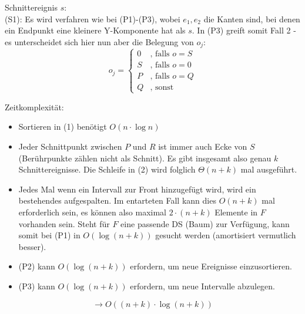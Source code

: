 Schnittereignis $s$:\\
(S1): Es wird verfahren wie bei (P1)-(P3), wobei $e_1,e_2$ die Kanten sind, bei denen ein Endpunkt eine kleinere Y-Komponente hat als $s$. In (P3) greift somit Fall 2 - es unterscheidet sich hier nun aber die Belegung von $o_j$:
$$o_j=\begin{cases}
0&\text{, falls }o=S\\
S&\text{, falls }o=0\\
P&\text{, falls }o=Q\\
Q&\text{, sonst} 
\end{cases}$$

Zeitkomplexität:\\
\begin{itemize}
\item Sortieren in (1) benötigt $O(n\cdot\log n)$
\item Jeder Schnittpunkt zwischen $P$ und $R$ ist immer auch Ecke von $S$ (Berührpunkte zählen nicht als Schnitt). Es gibt insgesamt also genau $k$ Schnittereignisse. Die Schleife in (2) wird folglich $\Theta (n+k)$ mal ausgeführt.
\item Jedes Mal wenn ein Intervall zur Front hinzugefügt wird, wird ein bestehendes aufgespalten. Im entarteten Fall kann dies $O(n+k)$ mal erforderlich sein, es können also maximal $2\cdot (n+k)$ Elemente in $F$ vorhanden sein. Steht für $F$ eine passende DS (Baum) zur Verfügung, kann somit bei (P1) in $O(\log (n+k))$ gesucht werden (amortisiert vermutlich besser).
\item (P2) kann $O(\log (n+k))$ erfordern, um neue Ereignisse einzusortieren.
\item (P3) kann $O(\log (n+k))$ erfordern, um neue Intervalle abzulegen.
\end{itemize}
$$\rightarrow O((n+k)\cdot\log (n+k))$$